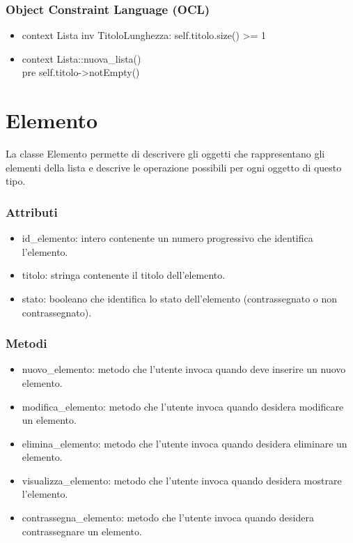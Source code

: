 \documentclass[a4paper,12pt]{article}
\begin{document}
\subsubsection*{Object Constraint Language (OCL)}
\begin{itemize}
\item {\ttfamily context Lista inv TitoloLunghezza: self.titolo.size() >= 1}
\item {\ttfamily context Lista::nuova\_lista() \\pre self.titolo->notEmpty() }

\end{itemize}
\section{Elemento}

La classe {\sffamily Elemento} permette di descrivere gli oggetti che rappresentano gli elementi della lista e descrive le operazione possibili per ogni oggetto di questo tipo.
\subsubsection*{Attributi}
\begin{itemize} \setlength\itemsep{0.01em}
\item {\ttfamily id\_elemento}: intero contenente un numero progressivo che identifica l'elemento.
\item {\ttfamily titolo}: stringa contenente il titolo dell'elemento.
\item {\ttfamily stato}: booleano che identifica lo stato dell'elemento (contrassegnato o non contrassegnato).
\end{itemize}
\subsubsection*{Metodi}
\begin{itemize} \setlength\itemsep{0.01em}
\item {\ttfamily nuovo\_elemento}: metodo che l'utente invoca quando deve inserire un nuovo elemento. 
\item {\ttfamily modifica\_elemento}: metodo che l'utente invoca quando desidera modificare un elemento.
\item {\ttfamily elimina\_elemento}: metodo che l'utente invoca quando desidera eliminare un elemento. 
\item {\ttfamily visualizza\_elemento}: metodo che l'utente invoca quando desidera mostrare l'elemento.
\item {\ttfamily contrassegna\_elemento}: metodo che l'utente invoca quando desidera contrassegnare un elemento. 
\end{itemize}
\end{document}
